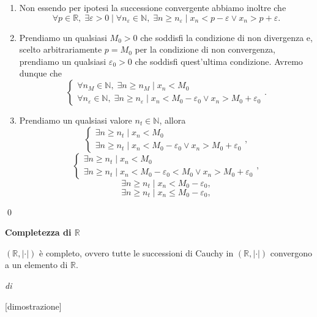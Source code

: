 \begin{demonstration}
\begin{enumerate}[label=(\roman*)]
\begin{enumerate}[label=\arabic*.]
\begin{enumerate}[label=\arabic{enumii}.\arabic*.]
                \item Non essendo per ipotesi la successione convergente abbiamo inoltre che \[
                    \forall p\in\mathbb{R},\;\exists\varepsilon>0\mid\forall n_\varepsilon\in\mathbb{N},\;\exists n\geq n_\varepsilon\mid x_n<p-\varepsilon\lor x_n>p+\varepsilon.
                \]
                \item Prendiamo un qualsiasi $M_0>0$ che soddisfi la condizione di non divergenza e, scelto arbitrariamente $p=M_0$ per la condizione
                    di non convergenza, prendiamo un qualsiasi $\varepsilon_0>0$ che soddisfi quest'ultima condizione. Avremo dunque che \[
                    \begin{cases}
                        \forall n_M\in\mathbb{N}, \; \exists n \geq n_M \mid x_n < M_0\\
                        \forall n_\varepsilon\in\mathbb{N},\;\exists n\geq n_\varepsilon\mid x_n<M_0-\varepsilon_0\lor x_n>M_0+\varepsilon_0
                    \end{cases}.
                \]
                \item Prendiamo un qualsiasi valore $n_t\in\mathbb{N}$, allora \[
                    \begin{cases}
                        \exists n \geq n_t \mid x_n < M_0 \\
                        \exists n \geq n_t\mid x_n<M_0-\varepsilon_0\lor x_n>M_0+\varepsilon_0
                    \end{cases},\]\[
                    \begin{cases}
                        \exists n \geq n_t \mid x_n < M_0 \\
                        \exists n \geq n_t\mid x_n<M_0-\varepsilon_0<M_0\lor x_n>M_0+\varepsilon_0
                    \end{cases},\]\[
                    \exists n \geq n_t\mid x_n<M_0-\varepsilon_0,\]\[
                    \exists n \geq n_t\mid x_n\leq M_0-\varepsilon_0,\]\[
                \]
            \end{enumerate}
        \end{enumerate}
    \end{enumerate}
    \qed
\end{demonstration}

\begin{theorem}
    \label{teo:com-rea}
    \textbf{Completezza di $\mathbb{R}$}

    $\left(\mathbb{R}, \left|\cdot\right|\right)$ è completo, ovvero tutte le successioni
    di Cauchy in $\left(\mathbb{R}, \left|\cdot\right|\right)$ convergono a un elemento di $\mathbb{R}$.
\end{theorem}

\begin{demonstration}
    \textit{di}

    [dimostrazione]
\end{demonstration}
